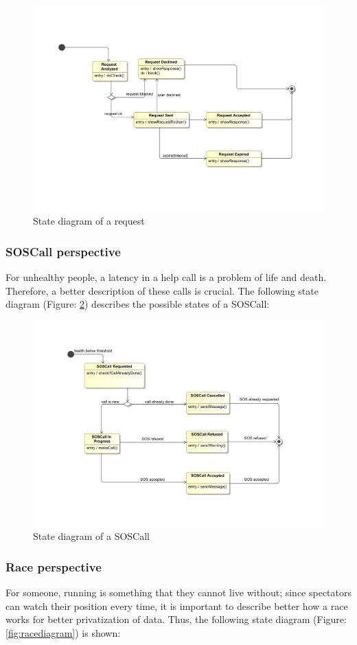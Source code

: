 \begin{figure}[H]
\includegraphics[width=0.8\linewidth]{Images/requestdiagram}
\caption{State diagram of a request}
\label{fig:requestdiagram}
\end{figure}

\subsubsection{SOSCall perspective}
For unhealthy people, a latency in a help call is a problem of life and death. Therefore, a better 
description of these calls is crucial. The following state diagram (Figure: \ref{fig:sosdiagram}) 
describes the possible states of a SOSCall:

\begin{figure}[H]
\includegraphics[width=0.8\linewidth]{Images/sosdiagram}
\caption{State diagram of a SOSCall}
\label{fig:sosdiagram}
\end{figure}

\subsubsection{Race perspective}
For someone, running is something that they cannot live without; since spectators can watch their 
position every time, it is important to describe better how a race works for better privatization of 
data. Thus, the following state diagram (Figure: \ref{fig:racediagram}) is shown: 


